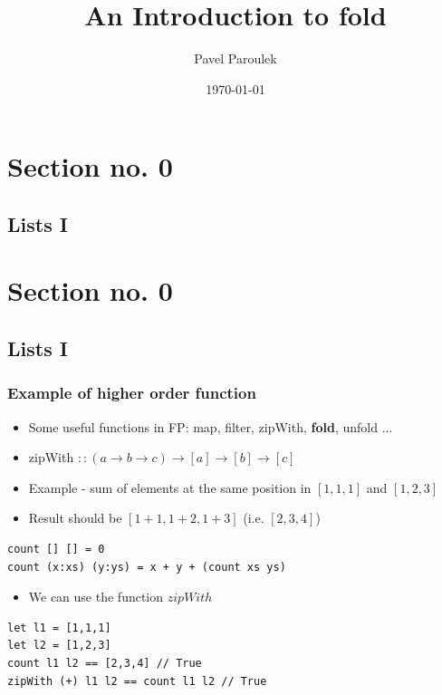 \documentclass[10pt]{beamer}
\begin{document}
\title{An Introduction to fold}   
\author{Pavel Paroulek}  
\date{\today} 

\frame{\titlepage} 


\section{Section no. 0} 
\subsection{Lists I}


\section{Section no. 0} 
\subsection{Lists I}
\begin{frame}[fragile]
\frametitle{Example of higher order function}
\begin{itemize}
\item Some useful functions in FP: map, filter, zipWith, \textbf{fold}, unfold ...
\item zipWith $:: (a \rightarrow b \rightarrow c) \rightarrow [a] \rightarrow [b] \rightarrow [c]$
\item Example - sum of elements at the same position in $[1,1,1]$ and $[1,2,3]$
\item Result should be $[1+1, 1+2,1+3]$ (i.e. $[2,3,4]$) 
\end{itemize}

\begin{lstlisting}
count [] [] = 0
count (x:xs) (y:ys) = x + y + (count xs ys) 

\end{lstlisting}


\begin{itemize}
\item We can use the function $zipWith$ 
\end{itemize}
\begin{lstlisting}
let l1 = [1,1,1] 
let l2 = [1,2,3] 
count l1 l2 == [2,3,4] // True	
zipWith (+) l1 l2 == count l1 l2 // True 	

\end{lstlisting}
\end{frame}
\end{document}
